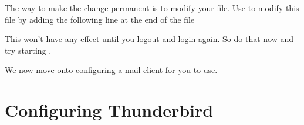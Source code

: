 The way to make the change permanent is to modify your   file. Use  to modify this file by adding the following line at the end of the file


This won't have any effect until you logout and login again. So do that now and try starting .

We now move onto configuring a mail client for you to use.

\section{Configuring Thunderbird}


